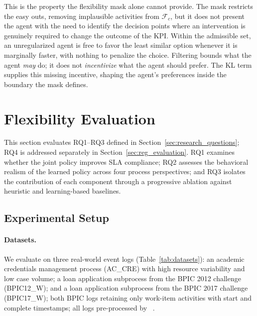\documentclass[journal,onecolumn]{IEEEtran}
\begin{document}
This is the property the flexibility mask alone cannot provide. The
mask restricts the easy outs, removing implausible activities from
$\mathcal{F}_c$, but it does not present the agent with the need to
identify the decision points where an intervention is genuinely
required to change the outcome of the KPI. Within the admissible set,
an unregularized agent is free to favor the least similar option
whenever it is marginally faster, with nothing to penalize the choice.
Filtering bounds what the agent \emph{may} do; it does not
\emph{incentivize} what the agent should prefer. The KL term supplies
this missing incentive, shaping the agent's preferences inside the
boundary the mask defines. 

\section{Flexibility Evaluation}
\label{sec:flex_evaluation}


This section evaluates RQ1--RQ3 defined
in Section~\ref{sec:research_questions}; RQ4 is addressed separately in
Section~\ref{sec:reg_evaluation}. RQ1 examines whether
the joint policy improves SLA compliance; RQ2 assesses the
behavioral realism of the learned policy across four process perspectives;
and RQ3 isolates the contribution of each component through a progressive
ablation against heuristic and learning-based baselines.


\subsection{Experimental Setup}
\label{subsec:setup}

\paragraph{Datasets.}
We evaluate on three real-world event logs
(Table~\ref{tab:datasets}): an academic credentials management
process (AC\_CRE) with high resource variability and low case
volume; a loan application subprocess from the BPIC 2012 challenge
(BPIC12\_W); and a loan application subprocess from the BPIC 2017
challenge (BPIC17\_W); both BPIC logs retaining only work-item
activities with start and complete timestamps; all logs
pre-processed by
\citeauthor{framework_for_measuring_the_quality_of_business_process_simulation_models}~\cite{framework_for_measuring_the_quality_of_business_process_simulation_models}.
\end{document}
